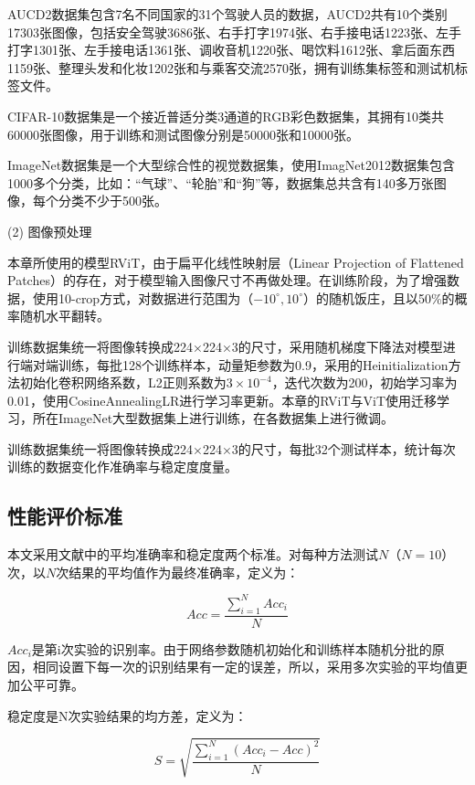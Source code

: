AUCD2数据集包含7名不同国家的31个驾驶人员的数据，AUCD2共有10个类别17303张图像，包括安全驾驶3686张、右手打字1974张、右手接电话1223张、左手打字1301张、左手接电话1361张、调收音机1220张、喝饮料1612张、拿后面东西1159张、整理头发和化妆1202张和与乘客交流2570张，拥有训练集标签和测试机标签文件。

CIFAR-10数据集是一个接近普适分类3通道的RGB彩色数据集，其拥有10类共60000张图像，用于训练和测试图像分别是50000张和10000张。

ImageNet数据集是一个大型综合性的视觉数据集，使用ImagNet2012数据集包含1000多个分类，比如：“气球”、“轮胎”和“狗”等，数据集总共含有140多万张图像，每个分类不少于500张。

(2)	图像预处理

本章所使用的模型RViT，由于扁平化线性映射层（Linear Projection of Flattened Patches）的存在，对于模型输入图像尺寸不再做处理。在训练阶段，为了增强数据，使用10-crop方式，对数据进行范围为（$-{10}^\circ,{10}^\circ$）的随机饭庄，且以50\%的概率随机水平翻转。

训练数据集统一将图像转换成224×224×3的尺寸，采用随机梯度下降法对模型进行端对端训练，每批128个训练样本，动量矩参数为0.9，采用的Heinitialization方法初始化卷积网络系数，L2正则系数为$3×10^{-4}$，迭代次数为200，初始学习率为0.01，使用CosineAnnealingLR进行学习率更新。本章的RViT与ViT使用迁移学习，所在ImageNet大型数据集上进行训练，在各数据集上进行微调。

训练数据集统一将图像转换成224×224×3的尺寸，每批32个测试样本，统计每次训练的数据变化作准确率与稳定度度量。

\subsection{性能评价标准}


本文采用文献\cite{66}中的平均准确率和稳定度两个标准。对每种方法测试$N$（$N=10$）次，以$N$次结果的平均值作为最终准确率，定义为：

\begin{equation}\label{公式3-11}
	Acc=\frac{\sum_{i=1}^{N}{Acc}_i}{N}
\end{equation}

${Acc}_i$是第i次实验的识别率。由于网络参数随机初始化和训练样本随机分批的原因，相同设置下每一次的识别结果有一定的误差，所以，采用多次实验的平均值更加公平可靠。

稳定度是N次实验结果的均方差，定义为：

\begin{equation}\label{公式3-12}
	S=\sqrt{\frac{\sum_{i=1}^{N}\left(Acc_i-Acc\right)^2}{N}}
\end{equation}

